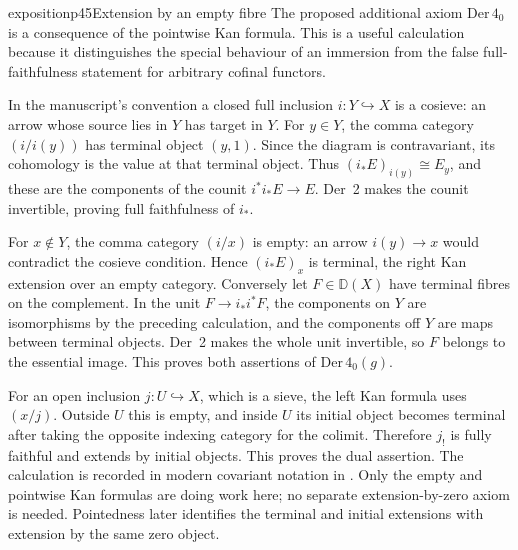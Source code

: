 \begin{dcomment}{exposition}{p45}{Extension by an empty fibre}
The proposed additional axiom $\mathrm{Der}\,4_0$ is a consequence of
the pointwise Kan formula. This is a useful calculation because it
distinguishes the special behaviour of an immersion from the false
full-faithfulness statement for arbitrary cofinal functors.

In the manuscript's convention a closed full inclusion
$i:Y\hookrightarrow X$ is a cosieve: an arrow whose source lies in
$Y$ has target in $Y$. For $y\in Y$, the comma category
$(i/i(y))$ has terminal object $(y,1)$. Since the diagram is
contravariant, its cohomology is the value at that terminal object.
Thus $(i_*E)_{i(y)}\cong E_y$, and these are the components of the
counit $i^*i_*E\to E$. Der~2 makes the counit invertible, proving
full faithfulness of $i_*$.

For $x\notin Y$, the comma category $(i/x)$ is empty: an arrow
$i(y)\to x$ would contradict the cosieve condition. Hence
$(i_*E)_x$ is terminal, the right Kan extension over an empty category.
Conversely let $F\in\mathbb D(X)$ have terminal fibres on the
complement. In the unit $F\to i_*i^*F$, the components on $Y$ are
isomorphisms by the preceding calculation, and the components off $Y$
are maps between terminal objects. Der~2 makes the whole unit
invertible, so $F$ belongs to the essential image. This proves both
assertions of $\mathrm{Der}\,4_0(g)$.

For an open inclusion $j:U\hookrightarrow X$, which is a sieve, the
left Kan formula uses $(x/j)$. Outside $U$ this is empty, and inside
$U$ its initial object becomes terminal after taking the opposite
indexing category for the colimit. Therefore $j_!$ is fully faithful
and extends by initial objects. This proves the dual assertion.
The calculation is recorded in modern covariant notation in
\citet[Proposition~1.23]{Groth2013}. Only the empty and pointwise
Kan formulas are doing work here; no separate extension-by-zero axiom
is needed. Pointedness later identifies the terminal and initial
extensions with extension by the same zero object.
\end{dcomment}

